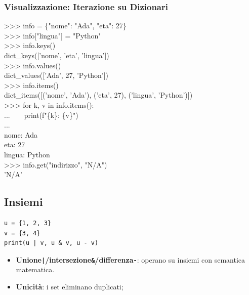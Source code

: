\subsubsection{Visualizzazione: Iterazione su Dizionari}
\begin{tcolorbox}[title=Output Terminale, colback=black, coltext=green!80!white, fontupper=\ttfamily\small]
>>> info = \{"nome": "Ada", "eta": 27\}\\
>>> info["lingua"] = "Python"\\
>>> info.keys()\\
dict\_keys(['nome', 'eta', 'lingua'])\\
>>> info.values()\\
dict\_values(['Ada', 27, 'Python'])\\
>>> info.items()\\
dict\_items([('nome', 'Ada'), ('eta', 27), ('lingua', 'Python')])\\
>>> for k, v in info.items():\\
...\ \ \ \ print(f"\{k\}: \{v\}")\\
...\\
nome: Ada\\
eta: 27\\
lingua: Python\\
>>> info.get("indirizzo", "N/A")\\
'N/A'
\end{tcolorbox}

\subsection{Insiemi}
\begin{lstlisting}
u = {1, 2, 3}
v = {3, 4}
print(u | v, u & v, u - v)
\end{lstlisting}
\begin{tcolorbox}[title=Spiegazione del codice]
\begin{itemize}
  \item \textbf{Unione\texttt{|}/intersezione\texttt{\&}/differenza\texttt{-}}: operano su insiemi con semantica matematica.
  \item \textbf{Unicità}: i set eliminano duplicati;
\end{itemize}
\end{tcolorbox}

